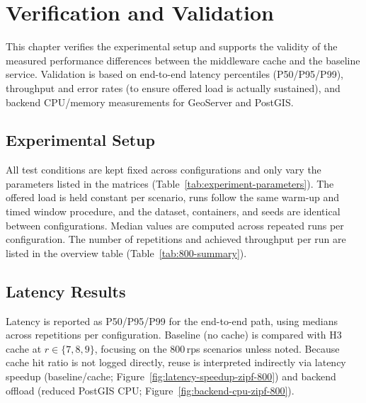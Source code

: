 \section{Verification and Validation}
This chapter verifies the experimental setup and supports the validity of the measured performance differences between the middleware cache and the baseline service. Validation is based on end-to-end latency percentiles (P50/P95/P99), throughput and error rates (to ensure offered load is actually sustained), and backend CPU/memory measurements for GeoServer and PostGIS.

\subsection{Experimental Setup}
All test conditions are kept fixed across configurations and only vary the parameters listed in the matrices (Table~\ref{tab:experiment-parameters}). The offered load is held constant per scenario, runs follow the same warm-up and timed window procedure, and the dataset, containers, and seeds are identical between configurations. Median values are computed across repeated runs per configuration. The number of repetitions and achieved throughput per run are listed in the overview table (Table~\ref{tab:800-summary}). 

\begin{table}[tbp]
  \centering
  \caption{Experiment parameter matrix used across configurations.}
  \label{tab:experiment-parameters}
  \begingroup
    \small
    \setlength{\tabcolsep}{4pt}
    \renewcommand{\arraystretch}{1.05}
    
  \endgroup
\end{table}

\clearpage
\begin{landscape}
\begin{table}[tbp]
  \centering
  \scriptsize
  \caption{Overview of the 800\,\ac{rps} scenarios: latency percentiles, throughput/errors, repetitions ($n_\text{reps}$), and backend resource usage (medians across repetitions; CPU is total across cores; memory in MiB).}
  \label{tab:800-summary}
  \begingroup
    \setlength{\tabcolsep}{3pt}
    \renewcommand{\arraystretch}{1.05}
    
  \endgroup
\end{table}
\end{landscape}
\clearpage

\subsection{Latency Results}
Latency is reported as P50/P95/P99 for the end-to-end path, using medians across repetitions per configuration. Baseline (no cache) is compared with H3 cache at $r\in\{7,8,9\}$, focusing on the 800\,\ac{rps} scenarios unless noted. Because cache hit ratio is not logged directly, reuse is interpreted indirectly via latency speedup (baseline/cache; Figure~\ref{fig:latency-speedup-zipf-800}) and backend offload (reduced PostGIS CPU; Figure~\ref{fig:backend-cpu-zipf-800}).

